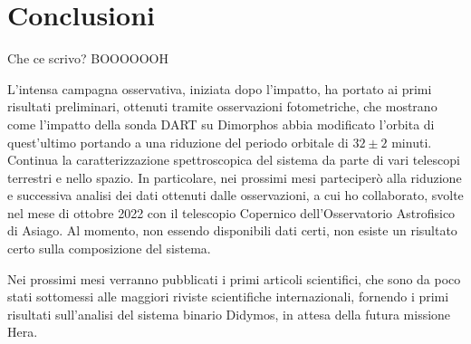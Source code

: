 \documentclass[a4paper,11pt,openright]{book}
\begin{document}
\chapter*{Conclusioni}
Che ce scrivo? BOOOOOOH

L'intensa campagna osservativa, iniziata dopo l'impatto, ha portato ai primi risultati preliminari, ottenuti tramite osservazioni fotometriche, che mostrano come l'impatto della sonda DART su Dimorphos abbia modificato l'orbita di quest'ultimo portando a una riduzione del periodo orbitale di $32 \pm 2$ minuti.\\
Continua la caratterizzazione spettroscopica del sistema da parte di vari telescopi terrestri e nello spazio. In particolare, nei prossimi mesi parteciperò alla riduzione e successiva analisi dei dati ottenuti dalle osservazioni, a cui ho collaborato, svolte nel mese di ottobre 2022 con il telescopio Copernico dell'Osservatorio Astrofisico di Asiago. Al momento, non essendo disponibili dati certi, non esiste un risultato certo sulla composizione del sistema. 

Nei prossimi mesi verranno pubblicati i primi articoli scientifici, che sono da poco stati sottomessi alle maggiori riviste scientifiche internazionali, fornendo i primi risultati sull'analisi del sistema binario Didymos, in attesa della futura missione Hera.


\cleardoublepage
{}
\printbibliography
\end{document}
